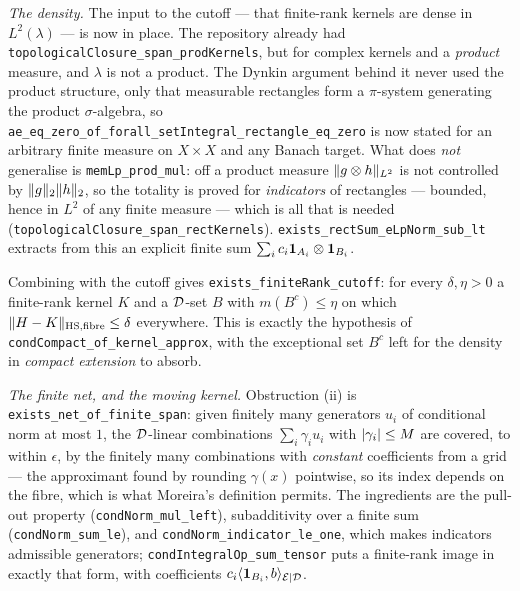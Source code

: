 \begin{remark}
  \smallskip
  \emph{The density.}  The input to the cutoff --- that finite-rank kernels are dense in
  $L^2(\lambda)$ --- is now in place.  The repository already had
  \texttt{topologicalClosure\_span\_prodKernels}, but for complex kernels and a \emph{product}
  measure, and $\lambda$ is not a product.  The Dynkin argument behind it never used the
  product structure, only that measurable rectangles form a $\pi$-system generating the
  product $\sigma$-algebra, so
  \texttt{ae\_eq\_zero\_of\_forall\_setIntegral\_rectangle\_eq\_zero} is now stated for an
  arbitrary finite measure on $X \times X$ and any Banach target.  What does \emph{not}
  generalise is \texttt{memLp\_prod\_mul}: off a product measure
  $\lVert g \otimes h \rVert_{L^2}$ is not controlled by $\lVert g \rVert_2\lVert h \rVert_2$, so the totality is
  proved for \emph{indicators} of rectangles --- bounded, hence in $L^2$ of any finite
  measure --- which is all that is needed
  (\texttt{topologicalClosure\_span\_rectKernels}).  \texttt{exists\_rectSum\_eLpNorm\_sub\_lt}
  extracts from this an explicit finite sum $\sum_i c_i \mathbf{1}_{A_i} \otimes \mathbf{1}_{B_i}$.

  Combining with the cutoff gives \texttt{exists\_finiteRank\_cutoff}: for every
  $\delta, \eta > 0$ a finite-rank kernel $K$ and a $\mathcal{D}$-set $B$ with $m(B^c) \leq \eta$ on
  which $\lVert H-K \rVert_{\mathrm{HS},\text{fibre}} \leq \delta$ everywhere.  This is exactly the
  hypothesis of \texttt{condCompact\_of\_kernel\_approx}, with the exceptional set $B^c$ left
  for the density in \emph{compact extension} to absorb.

  \smallskip
  \emph{The finite net, and the moving kernel.}  Obstruction (ii) is
  \texttt{exists\_net\_of\_finite\_span}: given finitely many generators $u_i$ of conditional
  norm at most $1$, the $\mathcal{D}$-linear combinations $\sum_i \gamma_i u_i$ with
  $\lvert \gamma_i \rvert \leq M$ are covered, to within $\epsilon$, by the finitely many
  combinations with \emph{constant} coefficients from a grid --- the approximant found by
  rounding $\gamma(x)$ pointwise, so its index depends on the fibre, which is what Moreira's
  definition permits.  The ingredients are the pull-out property
  (\texttt{condNorm\_mul\_left}), subadditivity over a finite sum
  (\texttt{condNorm\_sum\_le}), and \texttt{condNorm\_indicator\_le\_one}, which makes
  indicators admissible generators; \texttt{condIntegralOp\_sum\_tensor} puts a finite-rank
  image in exactly that form, with coefficients $c_i \langle \mathbf{1}_{B_i}, b \rangle_{\mathcal{E} \mid \mathcal{D}}$.


\end{remark}

